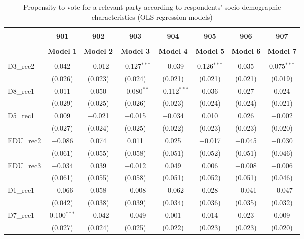\documentclass[
]{article}
\begin{document}
\begin{table}[!htbp] \centering 
  \caption{Propensity to vote for a relevant party according to respondents' 
                     socio-demographic characteristics (OLS regression models)} 
  \label{table:full_ols_ee} 
\begin{tabular}{@{\extracolsep{5pt}}lccccccc} 
\\[-1.8ex]\hline \\[-1.8ex] 
 & \textbf{901} & \textbf{902} & \textbf{903} & \textbf{904} & \textbf{905} & \textbf{906} & \textbf{907} \\ 
\\[-1.8ex] & \textbf{Model 1} & \textbf{Model 2} & \textbf{Model 3} & \textbf{Model 4} & \textbf{Model 5} & \textbf{Model 6} & \textbf{Model 7}\\ 
\hline \\[-1.8ex] 
 D3\_rec2 & 0.042 & $-$0.012 & $-$0.127$^{***}$ & $-$0.039 & 0.126$^{***}$ & 0.035 & 0.075$^{***}$ \\ 
  & (0.026) & (0.023) & (0.024) & (0.021) & (0.021) & (0.021) & (0.019) \\ 
  D8\_rec1 & 0.011 & 0.050 & $-$0.080$^{**}$ & $-$0.112$^{***}$ & 0.036 & 0.027 & 0.024 \\ 
  & (0.029) & (0.025) & (0.026) & (0.023) & (0.024) & (0.024) & (0.021) \\ 
  D5\_rec1 & 0.009 & $-$0.021 & $-$0.015 & $-$0.034 & 0.010 & 0.026 & $-$0.002 \\ 
  & (0.027) & (0.024) & (0.025) & (0.022) & (0.023) & (0.023) & (0.020) \\ 
  EDU\_rec2 & $-$0.086 & 0.074 & 0.011 & 0.025 & $-$0.017 & $-$0.045 & $-$0.030 \\ 
  & (0.061) & (0.055) & (0.058) & (0.051) & (0.052) & (0.051) & (0.046) \\ 
  EDU\_rec3 & $-$0.034 & 0.039 & $-$0.012 & 0.049 & 0.006 & $-$0.008 & $-$0.006 \\ 
  & (0.061) & (0.055) & (0.058) & (0.051) & (0.052) & (0.051) & (0.046) \\ 
  D1\_rec1 & $-$0.066 & 0.058 & $-$0.008 & $-$0.062 & 0.028 & $-$0.041 & $-$0.047 \\ 
  & (0.042) & (0.038) & (0.039) & (0.034) & (0.036) & (0.035) & (0.032) \\ 
  D7\_rec1 & 0.100$^{***}$ & $-$0.042 & $-$0.049 & 0.001 & 0.014 & 0.023 & 0.009 \\ 
  & (0.027) & (0.024) & (0.025) & (0.022) & (0.023) & (0.023) & (0.020) \\ 

\end{tabular}
\end{table}
\end{document}
